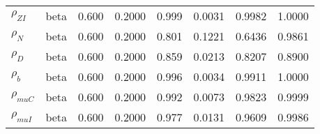 \begin{center}
\begin{longtable}{llcccccc}
${\rho_{ZI}}$ & beta &   0.600 & 0.2000 &   0.999& 0.0031 &  0.9982 &  1.0000 \\ 
${\rho_N}$ & beta &   0.600 & 0.2000 &   0.801& 0.1221 &  0.6436 &  0.9861 \\ 
${\rho_D}$ & beta &   0.600 & 0.2000 &   0.859& 0.0213 &  0.8207 &  0.8900 \\ 
${\rho_b}$ & beta &   0.600 & 0.2000 &   0.996& 0.0034 &  0.9911 &  1.0000 \\ 
${\rho_{muC}}$ & beta &   0.600 & 0.2000 &   0.992& 0.0073 &  0.9823 &  0.9999 \\ 
${\rho_{muI}}$ & beta &   0.600 & 0.2000 &   0.977& 0.0131 &  0.9609 &  0.9986 \\ 
\end{longtable}
 \end{center}
